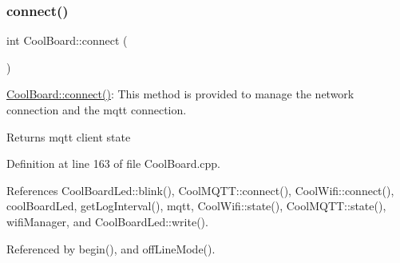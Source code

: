 \subsubsection{\texorpdfstring{connect()}{connect()}}
{\footnotesize\ttfamily int Cool\+Board\+::connect (\begin{DoxyParamCaption}{ }\end{DoxyParamCaption})}

\hyperlink{classCoolBoard_a519de78b807f8ec6463ff484eb925918}{Cool\+Board\+::connect()}\+: This method is provided to manage the network connection and the mqtt connection.

\begin{DoxyReturn}{Returns}
mqtt client state 
\end{DoxyReturn}


Definition at line 163 of file Cool\+Board.\+cpp.



References Cool\+Board\+Led\+::blink(), Cool\+M\+Q\+T\+T\+::connect(), Cool\+Wifi\+::connect(), cool\+Board\+Led, get\+Log\+Interval(), mqtt, Cool\+Wifi\+::state(), Cool\+M\+Q\+T\+T\+::state(), wifi\+Manager, and Cool\+Board\+Led\+::write().



Referenced by begin(), and off\+Line\+Mode().


